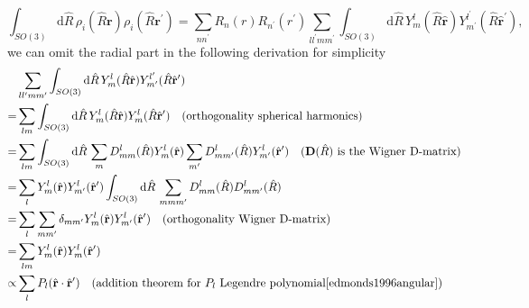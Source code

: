 \begin{equation}
  \int_{SO(3)}\mathrm{d}\hat{R}\, \rho_i(\hat{R}\mathbf{r})\rho_i(\hat{R}\mathbf{r}^\prime) = \sum_{nn^\prime} R_n(r)R_{n^\prime}(r^\prime) \sum_{ll^\prime mm^\prime}\int_{SO(3)}\mathrm{d}\hat{R}\, Y^{l}_m(\hat{R}\hat{\mathbf{r}})Y^{l^\prime}_{m^\prime}(\hat{R}\hat{\mathbf{r}}^\prime),
\end{equation}
we can omit the radial part in the following derivation for simplicity
\begin{subequations}
  \label{eq:solving_haar_integral}
\begin{align}
   & \sum_{ll^\prime mm^\prime}\int_{SO(3)}\mathrm{d}\hat{R}\, Y^{l}_m(\hat{R}\hat{\mathbf{r}})Y^{l^\prime}_{m^\prime}(\hat{R}\hat{\mathbf{r}}^\prime)\\
  =& \sum_{lm} \int_{SO(3)} \mathrm{d}\hat{R}\, Y^l_m(\hat{R}\hat{\mathbf{r}})Y^l_{m}(\hat{R}\hat{\mathbf{r}}^\prime) \quad \textrm{(orthogonality spherical harmonics)}\\
  =& \sum_{lm} \int_{SO(3)} \mathrm{d}\hat{R}\, \sum_{m}D_{m m}^l(\hat{R})Y^l_m(\hat{\mathbf{r}})\sum_{m^\prime}D_{m m^\prime}^l(\hat{R})Y^l_{m^\prime}(\hat{\mathbf{r}}^\prime) \quad \textrm{($\mathbf{D}(\hat{R})$ is the Wigner D-matrix)}\\
  =& \sum_{l} Y^l_m(\hat{\mathbf{r}})Y^l_{m^\prime}(\hat{\mathbf{r}}^\prime)\int_{SO(3)} \mathrm{d}\hat{R}\, \sum_{m mm^\prime}D_{m m}^l(\hat{R})D_{m m^\prime}^l(\hat{R})\\
  =& \sum_{l} \sum_{mm^\prime}\delta_{mm^\prime} Y^l_m(\hat{\mathbf{r}})Y^l_{m^\prime}(\hat{\mathbf{r}}^\prime) \quad \textrm{(orthogonality Wigner D-matrix)}\\
  =& \sum_{l m} Y^l_m(\hat{\mathbf{r}})Y^l_{m}(\hat{\mathbf{r}}^\prime) \\
  \propto& \sum_{l} P_l(\hat{\mathbf{r}}\cdot\hat{\mathbf{r}}^\prime) \quad \textrm{(addition theorem for $P_l$ Legendre polynomial\cite{edmonds1996angular})}
\end{align}
\end{subequations}
